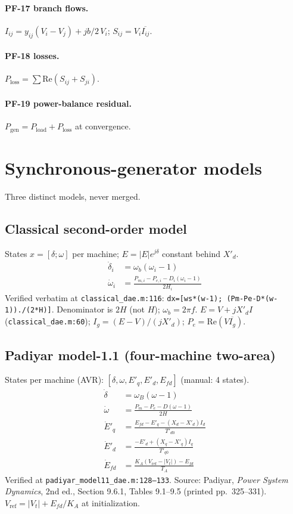\documentclass[12pt,a4paper]{article}
\begin{document}
\paragraph{PF-17 branch flows.}
$I_{ij}=y_{ij}(V_i-V_j)+jb/2\,V_i$; $S_{ij}=V_i\overline{I_{ij}}$.

\paragraph{PF-18 losses.}
$P_{\mathrm{loss}}=\sum\mathrm{Re}(S_{ij}+S_{ji})$.

\paragraph{PF-19 power-balance residual.}
$P_{\mathrm{gen}}=P_{\mathrm{load}}+P_{\mathrm{loss}}$ at convergence.

\section{Synchronous-generator models}

Three distinct models, never merged.

\subsection{Classical second-order model}

States $x=[\delta;\omega]$ per machine; $E=|E|e^{j\delta}$ constant behind
$X'_d$.
\begin{align}
\dot\delta_i &= \omega_b(\omega_i-1) \\
\dot\omega_i &= \frac{P_{m,i}-P_{e,i}-D_i(\omega_i-1)}{2H_i}
\end{align}
Verified verbatim at \texttt{classical\_dae.m:116}: \texttt{dx=[ws*(w-1); (Pm-Pe-D*(w-1))./(2*H)]}. Denominator is $2H$ (not $H$); $\omega_b=2\pi f$.
$E=V+jX'_d I$ (\texttt{classical\_dae.m:60}); $I_g=(E-V)/(jX'_d)$;
$P_e=\mathrm{Re}(V\overline{I_g})$.

\subsection{Padiyar model-1.1 (four-machine two-area)}

States per machine (AVR): $[\delta,\omega,E'_q,E'_d,E_{fd}]$ (manual: 4 states).
\begin{align}
\dot\delta &= \omega_B(\omega-1) \\
\dot\omega &= \frac{P_m-P_e-D(\omega-1)}{2H} \\
\dot E'_q &= \frac{E_{fd}-E'_q-(X_d-X'_d)I_d}{T'_{d0}} \\
\dot E'_d &= \frac{-E'_d+(X_q-X'_q)I_q}{T'_{q0}} \\
\dot E_{fd} &= \frac{K_A(V_{\mathrm{ref}}-|V_t|)-E_{fd}}{T_A}
\end{align}
Verified at \texttt{padiyar\_model11\_dae.m:128--133}. Source: Padiyar,
\emph{Power System Dynamics}, 2nd ed., Section 9.6.1, Tables 9.1--9.5
(printed pp.~325--331). $V_{\mathrm{ref}}=|V_t|+E_{fd}/K_A$ at initialization.
\end{document}
